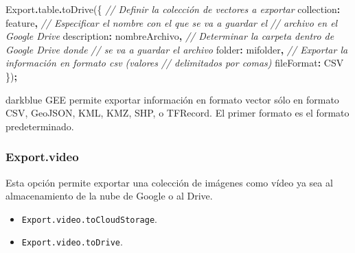 \documentclass[
  12pt,
  letterpaper,
  twoside]{book}
\newenvironment{Shaded}{\begin{snugshade}}{\end{snugshade}}
\newcommand{\AttributeTok}[1]{\textcolor[rgb]{0.77,0.63,0.00}{#1}}
\newcommand{\CommentTok}[1]{\textcolor[rgb]{0.56,0.35,0.01}{\textit{#1}}}
\newcommand{\DataTypeTok}[1]{\textcolor[rgb]{0.13,0.29,0.53}{#1}}
\newcommand{\FunctionTok}[1]{\textcolor[rgb]{0.00,0.00,0.00}{#1}}
\newcommand{\NormalTok}[1]{#1}
\newcommand{\OperatorTok}[1]{\textcolor[rgb]{0.81,0.36,0.00}{\textbf{#1}}}
\newcommand{\StringTok}[1]{\textcolor[rgb]{0.31,0.60,0.02}{#1}}
\providecommand{\tightlist}{%
  \setlength{\itemsep}{0pt}\setlength{\parskip}{0pt}}
\begin{document}
\begin{Shaded}
\begin{Highlighting}[]
\NormalTok{Export}\OperatorTok{.}\AttributeTok{table}\OperatorTok{.}\FunctionTok{toDrive}\NormalTok{(\{}
  \CommentTok{// Definir la colección de vectores a exportar}
  \DataTypeTok{collection}\OperatorTok{:}\NormalTok{ feature}\OperatorTok{,}
  \CommentTok{// Especificar el nombre con el que se va a guardar el }
  \CommentTok{// archivo en el Google Drive}
  \DataTypeTok{description}\OperatorTok{:} \StringTok{\textquotesingle{}nombreArchivo\textquotesingle{}}\OperatorTok{,}
  \CommentTok{// Determinar la carpeta dentro de Google Drive donde}
  \CommentTok{// se va a guardar el archivo}
  \DataTypeTok{folder}\OperatorTok{:} \StringTok{\textquotesingle{}mifolder\textquotesingle{}}\OperatorTok{,}
  \CommentTok{// Exportar la información en formato csv (valores }
  \CommentTok{// delimitados por comas)}
  \DataTypeTok{fileFormat}\OperatorTok{:} \StringTok{\textquotesingle{}CSV\textquotesingle{}}
\NormalTok{\})}\OperatorTok{;}
\end{Highlighting}
\end{Shaded}

\begin{bluebox2}

\begin{awesomeblock}{5pt}{\faLightbulb}{darkblue}
GEE permite exportar información en formato vector sólo en formato CSV, GeoJSON, KML, KMZ, SHP, o TFRecord. El primer formato es el formato predeterminado.

\end{awesomeblock}

\end{bluebox2}

\hypertarget{export.video}{%
\subsubsection*{Export.video}\label{export.video}}

Esta opción permite exportar una colección de imágenes como vídeo ya sea al almacenamiento de la nube de Google o al Drive.

\begin{itemize}
\tightlist
\item
  \texttt{Export.video.toCloudStorage}.
\item
  \texttt{Export.video.toDrive}.
\end{itemize}
\end{document}
